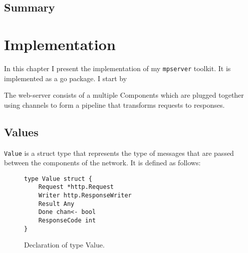 \documentclass[12pt,a4paper]{article}
\begin{document}
\subsection{Summary}


\newpage
\section{Implementation}
\label{sec:impl}
In this chapter I present the implementation of my \texttt{mpserver} toolkit.
It is implemented as a go package. I start by

The web-server consists of a multiple Components which are plugged 
together using channels to form a pipeline that transforms requests 
to responses.

\subsection{Values}
\texttt{Value} is a struct type that represents the type of messages that are
passed between the components of the network. It is defined as follows:

\begin{figure}[h]
\centering
\begin{lstlisting}
type Value struct {
    Request *http.Request
    Writer http.ResponseWriter
    Result Any
    Done chan<- bool
    ResponseCode int
}
\end{lstlisting}
\caption[scale=1.0]{Declaration of type Value.}
\label{fig:Value}
\end{figure}
\end{document}
